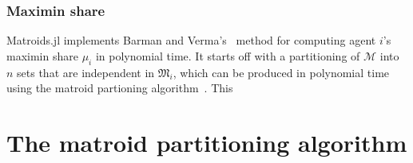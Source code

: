 \subsubsection*{Maximin share}
Matroids.jl implements Barman and Verma's~\cite{barman2021existence} method for computing agent $i$'s maximin share $\mu_i$ in polynomial time. It starts off with a partitioning of $\mathcal{M}$ into $n$ sets that are independent in $\mathfrak{M}_i$, which can be produced in polynomial time using the matroid partioning algorithm~\cite[p. 731]{schrijver-2003}. This

\section{The matroid partitioning algorithm}
\label{sec:matroid-union}